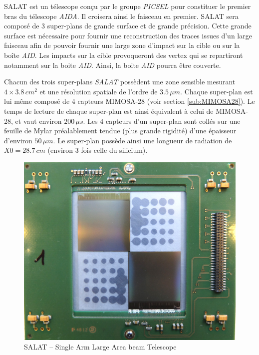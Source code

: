   SALAT est un télescope conçu par le groupe \textit{PICSEL} pour constituer le premier bras du télescope \textit{AIDA}. Il croisera ainsi le faisceau en premier. SALAT sera compos\'e de 3 super-plans de grande surface et de grande pr\'ecision. Cette grande surface est n\'ecessaire pour fournir une reconstruction des traces issues d'un large faisceau afin de pouvoir fournir une large zone d'impact sur la cible ou sur la boîte \textit{AID}. Les impacts sur la cible provoqueront des vertex qui se repartiront notamment sur la boite \textit{AID}. Ainsi, la boite \textit{AID} pourra \^etre couverte. 
  
  \medskip
  
  Chacun des trois super-plans \textit{SALAT} poss\`edent une zone sensible mesurant $4 \times 3.8 \, cm^2$ et une r\'esolution spatiale de l'ordre de $3.5 \, \mu m$. Chaque super-plan est lui m\^eme compos\'e de 4 capteurs MIMOSA-28 (voir section \ref{sub:MIMOSA28}). Le temps de lecture de chaque super-plan est ainsi équivalent \`a celui de MIMOSA-28, et vaut environ $200 \, \mu s$. Les 4 capteurs d'un super-plan sont coll\'es sur une feuille de Mylar pr\'ealablement tendue (plus grande rigidit\'e) d'une \'epaisseur d'environ $50 \, \mu m$. Le super-plan poss\`ede ainsi une longueur de radiation de $X0 = 28.7 \, cm$ (environ 3 fois celle du silicium).
  
  \begin{figure}[!htb]
    \begin{center} 
      \includegraphics[scale=0.07]{./figures/SALAT_2.jpg}
      \caption{SALAT – Single Arm Large Area beam Telescope}
      \label{fig:SALAT}
    \end{center}
  \end{figure}

